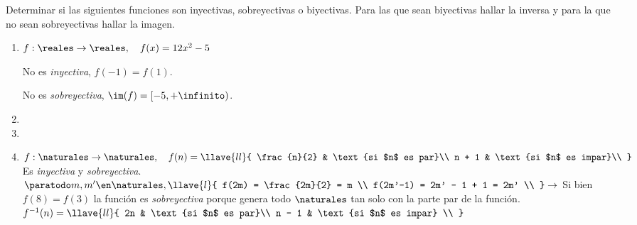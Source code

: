 \begin{enunciado}{\ejercicio}
  Determinar si las siguientes funciones son inyectivas, sobreyectivas o biyectivas.
  Para las que sean biyectivas hallar la inversa y para la que no sean sobreyectivas hallar la imagen.
\end{enunciado}

\begin{enumerate}[label=\roman*)]
  \item $f: \reales \to \reales,\quad f(x) = 12 x^2 - 5$\par
        No es \textit{inyectiva}, $f(-1) = f(1)$.\par
        No es \textit{sobreyectiva}, $\im(f) = [-5, +\infinito)$.
  \item \hacer

  \item \hacer

  \item $f: \naturales \to \naturales,\quad
          f(n) = \llave{ll}{
            \frac{n}{2} & \text{si $n$ es par}\\
            n + 1 & \text{si $n$ es impar}\\
          }$\\
        Es \textit{inyectiva} y \textit{sobreyectiva}. $\paratodo m,m' \en \naturales,
          \llave{l}{
            f(2m) = \frac{2m}{2} = m \\
            f(2m'-1) = 2m' - 1 + 1 = 2m' \\
          } \to$ Si bien $f(8) = f(3)$ la función es \textit{sobreyectiva} porque
        genera todo $\naturales$ tan solo con la parte par de la función.\\
        $f^{-1}(n) =
          \llave{ll}{
            2n    & \text{si $n$ es par}\\
            n - 1 & \text{si $n$ es impar} \\
          }$\\

\end{enumerate}
